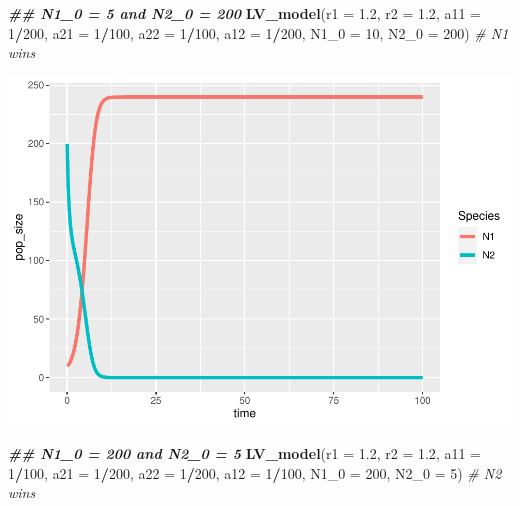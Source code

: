 \documentclass[
]{book}
\newenvironment{Shaded}{\begin{snugshade}}{\end{snugshade}}
\newcommand{\AttributeTok}[1]{\textcolor[rgb]{0.13,0.29,0.53}{#1}}
\newcommand{\CommentTok}[1]{\textcolor[rgb]{0.56,0.35,0.01}{\textit{#1}}}
\newcommand{\DecValTok}[1]{\textcolor[rgb]{0.00,0.00,0.81}{#1}}
\newcommand{\DocumentationTok}[1]{\textcolor[rgb]{0.56,0.35,0.01}{\textbf{\textit{#1}}}}
\newcommand{\FloatTok}[1]{\textcolor[rgb]{0.00,0.00,0.81}{#1}}
\newcommand{\FunctionTok}[1]{\textcolor[rgb]{0.13,0.29,0.53}{\textbf{#1}}}
\newcommand{\NormalTok}[1]{#1}
\newcommand{\SpecialCharTok}[1]{\textcolor[rgb]{0.81,0.36,0.00}{\textbf{#1}}}
\begin{document}
\begin{Shaded}
\begin{Highlighting}[]
  \DocumentationTok{\#\# N1\_0 = 5 and N2\_0 = 200}
  \FunctionTok{LV\_model}\NormalTok{(}\AttributeTok{r1 =} \FloatTok{1.2}\NormalTok{, }\AttributeTok{r2 =} \FloatTok{1.2}\NormalTok{, }\AttributeTok{a11 =} \DecValTok{1}\SpecialCharTok{/}\DecValTok{200}\NormalTok{, }\AttributeTok{a21 =} \DecValTok{1}\SpecialCharTok{/}\DecValTok{100}\NormalTok{, }\AttributeTok{a22 =} \DecValTok{1}\SpecialCharTok{/}\DecValTok{100}\NormalTok{, }\AttributeTok{a12 =} \DecValTok{1}\SpecialCharTok{/}\DecValTok{200}\NormalTok{, }\AttributeTok{N1\_0 =} \DecValTok{10}\NormalTok{, }\AttributeTok{N2\_0 =} \DecValTok{200}\NormalTok{)  }\CommentTok{\# N1 wins}
\end{Highlighting}
\end{Shaded}

\includegraphics{bookdown-demo_files/figure-latex/unnamed-chunk-21-2.pdf}

\begin{Shaded}
\begin{Highlighting}[]
  \DocumentationTok{\#\# N1\_0 = 200 and N2\_0 = 5}
  \FunctionTok{LV\_model}\NormalTok{(}\AttributeTok{r1 =} \FloatTok{1.2}\NormalTok{, }\AttributeTok{r2 =} \FloatTok{1.2}\NormalTok{, }\AttributeTok{a11 =} \DecValTok{1}\SpecialCharTok{/}\DecValTok{100}\NormalTok{, }\AttributeTok{a21 =} \DecValTok{1}\SpecialCharTok{/}\DecValTok{200}\NormalTok{, }\AttributeTok{a22 =} \DecValTok{1}\SpecialCharTok{/}\DecValTok{200}\NormalTok{, }\AttributeTok{a12 =} \DecValTok{1}\SpecialCharTok{/}\DecValTok{100}\NormalTok{, }\AttributeTok{N1\_0 =} \DecValTok{200}\NormalTok{, }\AttributeTok{N2\_0 =} \DecValTok{5}\NormalTok{)  }\CommentTok{\# N2 wins}
\end{Highlighting}
\end{Shaded}
\end{document}
